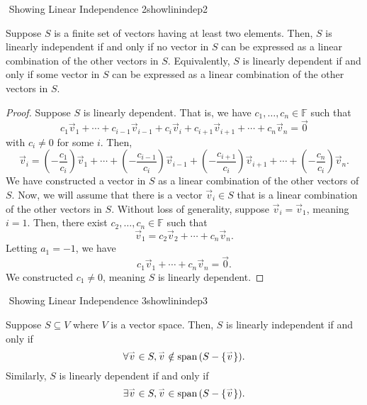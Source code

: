         \begin{theorem}{\Stop\,\,Showing Linear Independence 2}{showlinindep2}
            
            Suppose \(S\) is a finite set of vectors having at least two elements. Then, \(S\) is linearly independent if and only if no vector in \(S\) can be expressed as a linear combination of the other vectors in \(S\). Equivalently, \(S\) is linearly dependent if and only if some vector in \(S\) can be expressed as a linear combination of the other vectors in \(S\).
            \begin{proof}
                Suppose \(S\) is linearly dependent. That is, we have \(c_1,\ldots,c_n\in\mathbb{F}\) such that
                \begin{equation*}
                    c_1\vec{v}_1+\cdots+c_{i-1}\vec{v}_{i-1}+c_i\vec{v}_i+c_{i+1}\vec{v}_{i+1}+\cdots+c_n\vec{v}_n=\vec{0}
                \end{equation*}
                with \(c_i\neq0\) for some \(i\). Then,
                \begin{equation*}
                    \vec{v}_i=\left(-\frac{c_1}{c_i}\right)\vec{v}_1+\cdots+\left(-\frac{c_{i-1}}{c_i}\right)\vec{v}_{i-1}+\left(-\frac{c_{i+1}}{c_i}\right)\vec{v}_{i+1}+\cdots+\left(-\frac{c_n}{c_i}\right)\vec{v}_n.
                \end{equation*}
                We have constructed a vector in \(S\) as a linear combination of the other vectors of \(S\). Now, we will assume that there is a vector \(\vec{v}_i\in S\) that is a linear combination of the other vectors in \(S\). Without loss of generality, suppose \(\vec{v}_i=\vec{v}_1\), meaning \(i=1\). Then, there exist \(c_2,\ldots,c_n\in\mathbb{F}\) such that
                \begin{equation*}
                    \vec{v}_1=c_2\vec{v}_2+\cdots+c_n\vec{v}_n.
                \end{equation*}
                Letting \(a_1=-1\), we have
                \begin{equation*}
                    c_1\vec{v}_1+\cdots+c_n\vec{v}_n=\vec{0}.
                \end{equation*}
                We constructed \(c_1\neq0\), meaning \(S\) is linearly dependent.
            \end{proof}
        \end{theorem}
        \begin{theorem}{\Stop\,\,Showing Linear Independence 3}{showlinindep3}
            
            Suppose \(S\subseteq V\) where \(V\) is a vector space. Then, \(S\) is linearly independent if and only if
            \begin{equation*}
                \forall\overset{_{\rightharpoonup}}{v}\in S,\overset{_{\rightharpoonup}}{v}\notin\text{span\,}(S-\{\overset{_{\rightharpoonup}}{v}\}).
            \end{equation*}
            Similarly, \(S\) is linearly dependent if and only if
            \begin{equation*}
                \exists\overset{_{\rightharpoonup}}{v}\in S,\overset{_{\rightharpoonup}}{v}\in\text{span\,}(S-\{\overset{_{\rightharpoonup}}{v}\}).
            \end{equation*}

        \end{theorem}